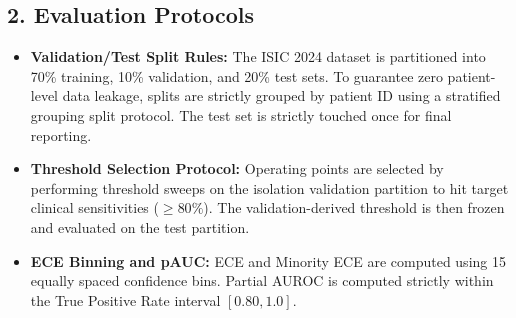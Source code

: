 \documentclass[letterpaper]{article} %
\begin{document}
\subsection*{2. Evaluation Protocols}
\begin{itemize}
    \item \textbf{Validation/Test Split Rules:} The ISIC 2024 dataset is partitioned into 70\% training, 10\% validation, and 20\% test sets. To guarantee zero patient-level data leakage, splits are strictly grouped by patient ID using a stratified grouping split protocol. The test set is strictly touched once for final reporting.
    \item \textbf{Threshold Selection Protocol:} Operating points are selected by performing threshold sweeps on the isolation validation partition to hit target clinical sensitivities ($\ge 80\%$). The validation-derived threshold is then frozen and evaluated on the test partition.
    \item \textbf{ECE Binning and pAUC:} ECE and Minority ECE are computed using 15 equally spaced confidence bins. Partial AUROC is computed strictly within the True Positive Rate interval $[0.80, 1.0]$.
\end{itemize}
\end{document}
